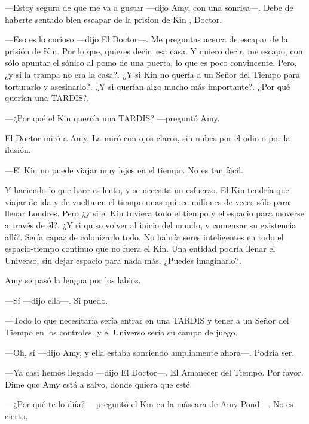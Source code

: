 ---Estoy segura de que me va a gustar ---dijo Amy, con una sonrisa---. Debe de haberte sentado bien escapar de la prision de Kin , Doctor.

---Eso es lo curioso ---dijo El Doctor---. Me preguntas acerca de escapar de la prisión de Kin. Por lo que, quieres decir, esa casa. Y quiero decir, me escapo, con sólo apuntar el sónico al pomo de una puerta, lo que es poco convincente. Pero, ¿y si la trampa no era la casa?. ¿Y si Kin no quería a un Señor del Tiempo para torturarlo y asesinarlo?. ¿Y si querían algo mucho más importante?. ¿Por qué querían una TARDIS?.

---¿Por qué el Kin querría una TARDIS? ---preguntó Amy.

El Doctor miró a Amy. La miró con ojos claros, sin nubes por el odio o por la ilusión.

---El Kin no puede viajar muy lejos en el tiempo. No es tan fácil.

Y haciendo lo que hace es lento, y se necesita un esfuerzo. El Kin tendría que viajar de ida y de vuelta en el tiempo unas quince millones de veces sólo para llenar Londres. Pero ¿y si el Kin tuviera todo el tiempo y el espacio para moverse a través de él?. ¿Y si quiso volver al inicio del mundo, y comenzar su existencia allí?. Sería capaz de colonizarlo todo. No habría seres inteligentes en todo el espacio-tiempo continuo que no fuera el Kin. Una entidad podría llenar el Universo, sin dejar espacio para nada más. ¿Puedes imaginarlo?.

Amy se pasó la lengua por los labios.

---Sí ---dijo ella---. Sí puedo.

---Todo lo que necesitaría sería entrar en una TARDIS y tener a un Señor del Tiempo en los controles, y el Universo sería su campo de juego.

---Oh, sí ---dijo Amy, y ella estaba sonriendo ampliamente ahora---. Podría ser.

---Ya casi hemos llegado ---dijo El Doctor---. El Amanecer del Tiempo. Por favor. Dime que Amy está a salvo, donde quiera que esté.

---¿Por qué te lo diía? ---preguntó el Kin en la máscara de Amy Pond---. No es cierto.

